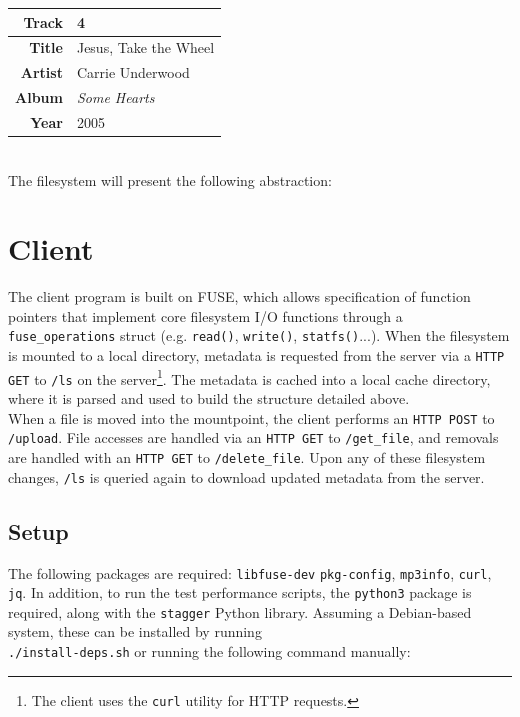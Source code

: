 \documentclass{article}
\begin{document}
	\begin{tabular}{| r | l |}
		\hline
		\textbf{Track} & 4 \\ \hline
		\textbf{Title} & Jesus, Take the Wheel \\ \hline
		\textbf{Artist} & Carrie Underwood \\ \hline
		\textbf{Album} & \textit{Some Hearts} \\ \hline 
		\textbf{Year} & 2005 \\ \hline
	\end{tabular} \\
	
	\noindent The filesystem will present the following abstraction: \\ 
	
		
	\section{Client}
	The client program is built on FUSE, which allows specification of function pointers that implement core filesystem I/O functions through a \texttt{fuse\_operations} struct (e.g. \texttt{read()}, \texttt{write()}, \texttt{statfs()}...). When the filesystem is mounted to a local directory, metadata is requested from the server via a \texttt{HTTP GET} to \texttt{/ls} on the server\footnote{The client uses the \texttt{curl} utility for HTTP requests.}. The metadata is cached into a local cache directory, where it is parsed and used to build the structure detailed above. \\
	
	\noindent When a file is moved into the mountpoint, the client performs an \texttt{HTTP POST} to \texttt{/upload}. File accesses are handled via an \texttt{HTTP GET} to \texttt{/get\_file}, and removals are handled with an \texttt{HTTP GET} to \texttt{/delete\_file}. Upon any of these filesystem changes, \texttt{/ls} is queried again to download updated metadata from the server.
	
	\subsection{Setup}
	The following packages are required: \texttt{libfuse-dev} \texttt{pkg-config}, \texttt{mp3info}, \texttt{curl}, \texttt{jq}. In addition, to run the test performance scripts, the \texttt{python3} package is required, along with the \texttt{stagger} Python library. Assuming a Debian-based system, these can be installed by running \\ \texttt{./install-deps.sh} or running the following command manually:
	
\end{document}
